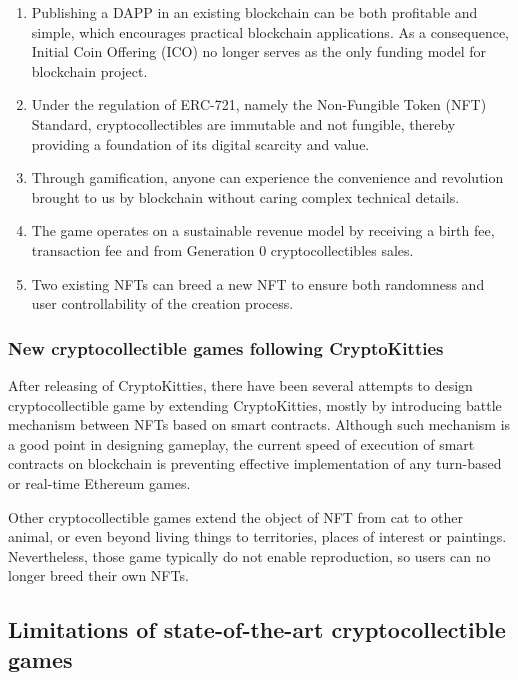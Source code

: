 \documentclass[b5paper]{article}
\begin{document}
\begin{enumerate}
\item Publishing a DAPP in an existing blockchain can be both profitable and simple, which encourages practical blockchain applications. As a consequence, Initial Coin Offering (ICO) no longer serves as the only funding model for blockchain project.
\item Under the regulation of ERC-721, namely the Non-Fungible Token (NFT) Standard, cryptocollectibles are immutable and not fungible, thereby providing a foundation of its digital scarcity and value.
\item Through gamification, anyone can experience the convenience and revolution brought to us by blockchain without caring complex technical details.
\item The game operates on a sustainable revenue model by receiving a birth fee, transaction fee and from Generation 0 cryptocollectibles sales.
\item Two existing NFTs can breed a new NFT to ensure both randomness and user controllability of the creation process.
\end{enumerate}


\subsubsection{New cryptocollectible games following CryptoKitties}
After releasing of CryptoKitties, there have been several attempts to design cryptocollectible game by extending CryptoKitties, 
mostly by introducing battle mechanism between NFTs\cite{cryptofighters,fishbank,cryptomons,etheremon} based on smart contracts. 
Although such mechanism is a good point in designing gameplay,
the current speed of execution of smart contracts on blockchain is preventing effective implementation of any turn-based or real-time Ethereum games.

Other cryptocollectible games extend the object of NFT from cat to other animal\cite{cryptopets,etheremon}, or even beyond living things to territories\cite{cryptocountries}, places of interest\cite{cryptolandmarks} or paintings\cite{cryptoarts}. 
Nevertheless, those game typically do not enable reproduction, 
so users can no longer breed their own NFTs.

\subsection{Limitations of state-of-the-art cryptocollectible games}
\end{document}
